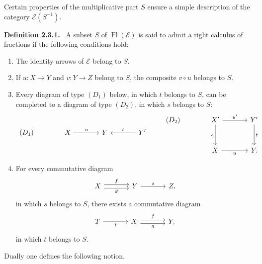 \documentclass[11pt]{article}
\newenvironment{statement}[1]{\par\medskip\noindent\textbf{#1.}\ }{\par\medskip}
\providecommand{\Fl}{\operatorname{Fl}}
\providecommand{\cE}{\mathcal E}
\begin{document}
Certain properties of the multiplicative part $S$ ensure a simple description of the category $\cE(S^{-1})$.

\label{sga5:V:definition:2.3.1}\begin{statement}{Definition 2.3.1}
A subset $S$ of $\Fl(\cE)$ is said to admit a right calculus of fractions if the following conditions hold:
\begin{enumerate}[label=(\alph*)]
\item The identity arrows of $\cE$ belong to $S$.
\item If $u:X\to Y$ and $v:Y\to Z$ belong to $S$, the composite $v\circ u$ belongs to $S$.
\item Every diagram of type $(D_1)$ below, in which $t$ belongs to $S$, can be completed to a diagram of type $(D_2)$, in which $s$ belongs to $S$:
\[
\begin{tikzcd}[column sep=large]
(D_1)& X \arrow[r,"u"] & Y & Y' \arrow[l,"t"']
\end{tikzcd}
\qquad
\begin{tikzcd}[column sep=large,row sep=large]
(D_2)& X' \arrow[r,"u'"] \arrow[d,"s"'] & Y' \arrow[d,"t"]\\
& X \arrow[r,"u"'] & Y .
\end{tikzcd}
\]
\item For every commutative diagram
\[
\begin{tikzcd}[column sep=large]
X \arrow[r,shift left,"f"] \arrow[r,shift right,"g"'] & Y \arrow[r,"s"] & Z,
\end{tikzcd}
\]
in which $s$ belongs to $S$, there exists a commutative diagram
\[
\begin{tikzcd}[column sep=large]
T \arrow[r,"t"'] & X \arrow[r,shift left,"f"] \arrow[r,shift right,"g"'] & Y,
\end{tikzcd}
\]
in which $t$ belongs to $S$.
\end{enumerate}
\end{statement}

Dually one defines the following notion.
\end{document}
